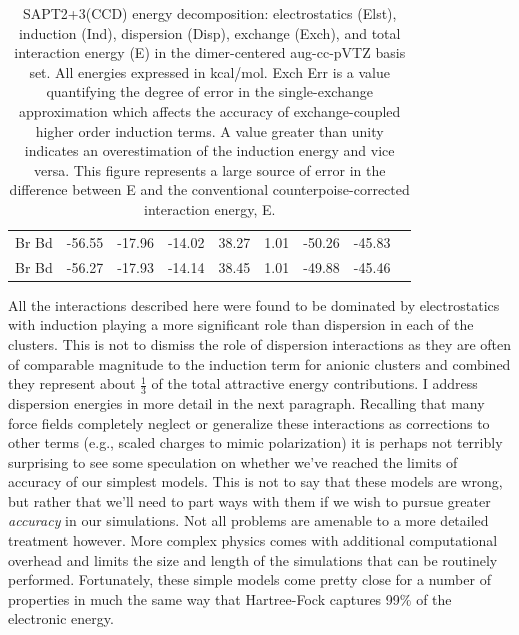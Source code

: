 \begin{sie}
\begin{table}
\begin{center}
\begin{tabular}{lrrrrccrr}
Br\sur{-} Bd              & -56.55 &-17.96 &-14.02 &38.27 &1.01 & -50.26 &-45.83 \tabularnewline
Br\sur{-} Bd\sur{\prime}  & -56.27 &-17.93 &-14.14 &38.45 &1.01 & -49.88 &-45.46 \tabularnewline
  \hline
 \end{tabular}
 \end{center}
 \caption[Interaction energies for ion/water clusters with \emph{n} = 6]{\label{tab:sapt4} SAPT2+3(CCD) energy decomposition: electrostatics
 (Elst), induction (Ind), dispersion (Disp), exchange (Exch), 
 and total interaction energy (E) in the dimer-centered aug-cc-pVTZ basis set. All energies expressed in kcal/mol. Exch Err is a 
 value quantifying the degree of error in the single-exchange approximation which affects the accuracy of exchange-coupled higher order 
 induction terms. A value greater than unity indicates an overestimation of the induction energy and vice versa. This figure represents
 a large source of error in the difference between E and the conventional counterpoise-corrected interaction energy, E.}
\end{table}

  All the interactions described here were found to be dominated by electrostatics with induction playing a more significant role than dispersion in each
  of the clusters. This is not to dismiss the role of dispersion interactions as they are often of comparable magnitude to the induction term for anionic
  clusters and combined they represent about $\frac{1}{3}$ of the total attractive energy contributions. I address dispersion energies in more detail in 
  the next paragraph. Recalling that many force fields completely neglect or generalize these interactions as corrections to other terms (e.g., scaled 
  charges to mimic polarization) it is perhaps not terribly surprising to see some speculation on whether we've reached the limits of accuracy of our 
  simplest models\cite{izadi2016limit3ptaccuracy,li2016replacewatmod}. This is not to say that these models are wrong, but rather that we'll need to part 
  ways with them if we wish to pursue greater \emph{accuracy} in our simulations. Not all problems are amenable to a more detailed treatment however. More
  complex physics comes with additional computational overhead and limits the size and length of the simulations that can be routinely performed.
  Fortunately, these simple models come pretty close for a number of properties in much the same way that Hartree-Fock captures 99$\%$ of the electronic 
  energy.


\end{sie}
